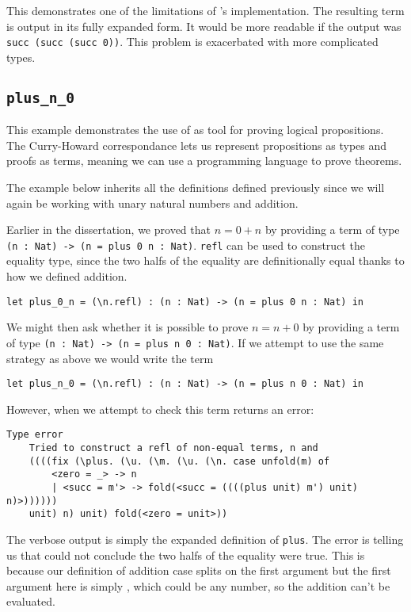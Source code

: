 \documentclass[12pt,a4paper,twoside]{report}
\begin{document}
This demonstrates one of the limitations of \pimu{}'s implementation.
The resulting term is output in its fully expanded form.
It would be more readable if the output was \lstinline{succ (succ (succ 0))}.
This problem is exacerbated with more complicated types.

\subsection{\texttt{plus\_n\_0}}

This example demonstrates the use of \pimu{} as tool for proving logical propositions.
The Curry-Howard correspondance \cite{howard80} lets us represent propositions as types and proofs as terms, meaning we can use a programming language to prove theorems.

The example below inherits all the definitions defined previously since we will again be working with unary natural numbers and addition.

Earlier in the dissertation, we proved that \(n = 0 + n\) by providing a term of type \lstinline{(n : Nat) -> (n = plus 0 n : Nat)}.
\texttt{refl} can be used to construct the equality type, since the two halfs of the equality are definitionally equal thanks to how we defined addition.
\begin{lstlisting}[gobble=4]
    let plus_0_n = (\n.refl) : (n : Nat) -> (n = plus 0 n : Nat) in
\end{lstlisting}

We might then ask whether it is possible to prove \(n = n + 0\) by providing a term of type \lstinline{(n : Nat) -> (n = plus n 0 : Nat)}.
If we attempt to use the same strategy as above we would write the term
\begin{lstlisting}[gobble=4]
    let plus_n_0 = (\n.refl) : (n : Nat) -> (n = plus n 0 : Nat) in
\end{lstlisting}
However, when we attempt to check this term \pimu{} returns an error:
\begin{lstlisting}[gobble=4]
    Type error
    Tried to construct a refl of non-equal terms, n and
    ((((fix (\plus. (\u. (\m. (\u. (\n. case unfold(m) of 
        <zero = _> -> n
        | <succ = m'> -> fold(<succ = ((((plus unit) m') unit) n)>)))))) 
    unit) n) unit) fold(<zero = unit>))
\end{lstlisting}
The verbose output is simply the expanded definition of \texttt{plus}.
The error is telling us that \pimu{} could not conclude the two halfs of the equality were true.
This is because our definition of addition case splits on the first argument but the first argument here is simply , which could be any number, so the addition can't be evaluated.
\end{document}
